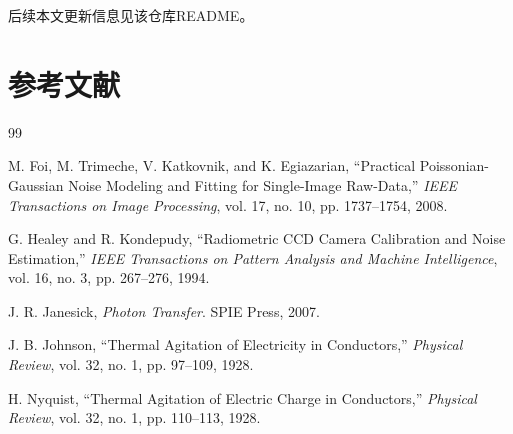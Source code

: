 \documentclass[journal]{IEEEtran}
\begin{document}
后续本文更新信息见该仓库README。


\section{参考文献}


\begin{thebibliography}{99}

M. Foi, M. Trimeche, V. Katkovnik, and K. Egiazarian,
``Practical Poissonian-Gaussian Noise Modeling and Fitting for Single-Image Raw-Data,''
\textit{IEEE Transactions on Image Processing},
vol. 17, no. 10, pp. 1737--1754, 2008.

G. Healey and R. Kondepudy,
``Radiometric CCD Camera Calibration and Noise Estimation,''
\textit{IEEE Transactions on Pattern Analysis and Machine Intelligence},
vol. 16, no. 3, pp. 267--276, 1994.

J. R. Janesick,
\textit{Photon Transfer}.
SPIE Press, 2007.

J. B. Johnson,
``Thermal Agitation of Electricity in Conductors,''
\textit{Physical Review},
vol. 32, no. 1, pp. 97--109, 1928.

H. Nyquist,
``Thermal Agitation of Electric Charge in Conductors,''
\textit{Physical Review},
vol. 32, no. 1, pp. 110--113, 1928.

\end{thebibliography}
\end{document}
